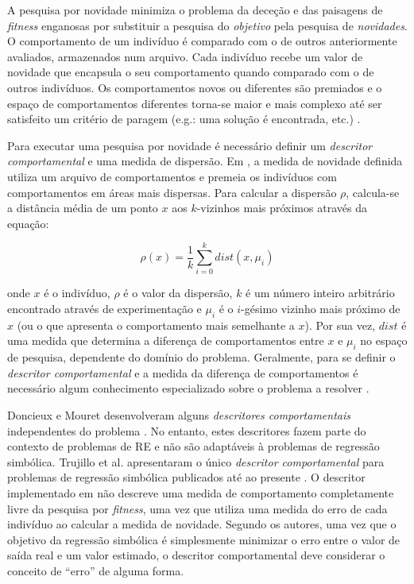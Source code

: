 A pesquisa por novidade minimiza o problema da deceção e das paisagens de \emph{fitness} enganosas por substituir a pesquisa do \emph{objetivo} 
pela pesquisa de \emph{novidades}. O comportamento de um indivíduo é comparado com o de outros anteriormente avaliados, armazenados num arquivo. 
Cada indivíduo recebe um valor de novidade que encapsula o seu comportamento quando comparado com o de outros indivíduos. Os comportamentos 
novos ou diferentes são premiados e o espaço de comportamentos diferentes torna-se maior e mais complexo até ser satisfeito
um critério de paragem (e.g.: uma solução é encontrada, etc.) \citep{Lehman2008}.

Para executar uma pesquisa por novidade é necessário definir um \emph{descritor comportamental} e uma medida de dispersão. 
Em \citep{Lehman2008}, a medida de novidade definida utiliza um arquivo de comportamentos e premeia os indivíduos com comportamentos em áreas 
mais dispersas. Para calcular a dispersão $\rho$, calcula-se a distância média de um ponto $x$ aos $k$-vizinhos mais próximos através da 
equação:

\begin{equation}
\rho(x) = \frac{1}{k}\sum_{i=0}^{k}dist(x,\mu_i)
\label{Equacao5313}
\end{equation}

\noindent onde $x$ é o indivíduo, $\rho$ é o valor da dispersão, $k$ é um número inteiro arbitrário encontrado através de experimentação e 
$\mu_i$ é o
$i$-gésimo vizinho mais próximo de $x$ (ou o que apresenta o comportamento mais semelhante a $x$). Por sua vez, $dist$ é uma medida que determina a diferença de comportamentos 
entre $x$ e $\mu_i$ no espaço de pesquisa, dependente do domínio do problema. Geralmente, para se definir o \emph{descritor comportamental}
e a medida da diferença de comportamentos é necessário algum conhecimento especializado sobre o problema a resolver \citep{Doncieux2010}.

Doncieux e Mouret desenvolveram alguns \emph{descritores comportamentais} independentes do problema \citep{Doncieux2010}. No entanto, 
estes descritores fazem parte do contexto de problemas de \ac{RE} e não são adaptáveis à problemas de regressão simbólica. 
Trujillo et al. apresentaram o único \emph{descritor comportamental} para problemas de regressão simbólica publicados até ao presente
\citep{Trujillo2013}. O descritor implementado em \citep{Trujillo2013} não descreve uma medida de comportamento completamente livre da pesquisa por \emph{fitness}, 
uma vez que utiliza uma medida do erro de cada indivíduo ao calcular a medida de novidade. Segundo os autores, uma vez que o objetivo
da regressão simbólica é simplesmente minimizar o erro entre o valor de saída real e um valor estimado, o descritor comportamental
deve considerar o conceito de ``erro'' de alguma forma.

